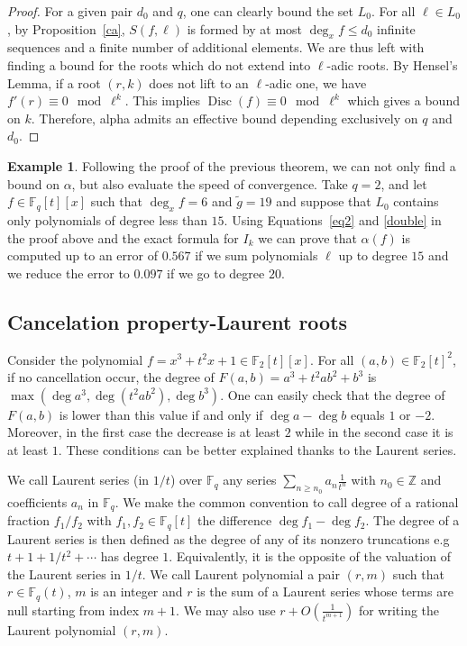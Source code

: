 \documentclass[a4wide]{article}
\newcommand{\F}{{\mathbb F}}
\newcommand{\Z}{{\mathbb Z}}
\DeclareMathOperator{\Disc}{Disc}
\theoremstyle{plain}
\theoremstyle{definition}
\newtheorem{ex}[theo]{Example}
\theoremstyle{remark}
\begin{document}
\begin{proof}
For a given pair $d_0$ and $q$, one can clearly bound the set $L_0$.
For all $\ell\in L_0$, by Proposition~\ref{ca}, $S(f,\ell)$ is formed by at most
$\deg_xf\leq d_0$ infinite sequences and a finite number of additional
elements. We are thus left with finding a bound for the roots which do not
extend into $\ell$-adic roots. By Hensel's
Lemma, if a root $(r,k)$ does not lift to an $\ell$-adic one, we have
$f'(r)\equiv 0\mod \ell^k$. This implies $\Disc(f)\equiv 0\mod \ell^k$ which
gives a bound on $k$. Therefore, alpha admits an effective bound depending exclusively on $q$ and $d_0$. 
\end{proof}
\begin{ex}
     Following the proof of the previous theorem, we can not only find a
     bound on $\alpha$, but also evaluate the speed of convergence.
	Take $q=2$, and let $f\in \F_q[t][x]$ such that $\deg_x f=6$
	and $\tilde{g}=19$ and suppose that $L_0$ contains only polynomials of degree
	less than $15$. Using Equations~\ref{eq2} and \ref{double} in the
	proof above and the exact formula for $I_k$ we can prove that
	$\alpha(f)$ is computed up to an error of $0.567$ if we sum
	polynomials $\ell$ up to degree $15$ and we reduce the error to
	$0.097$ if we go to degree $20$. 
\end{ex}

\subsection{Cancelation property-Laurent roots}
Consider the polynomial $f=x^3+t^2x+1\in\F_2[t][x]$. For all $(a,b)\in
\F_2[t]^2$, if no cancellation occur, the degree of $F(a,b)=a^3+t^2ab^2+b^3$ is $\max(\deg
a^3,\deg(t^2ab^2),\deg b^3)$. One can easily check that the degree of
$F(a,b)$ is lower than this value if and only if $\deg a-\deg b$
equals $1$ or $-2$. Moreover, in the first case the decrease is at least $2$
while in the second case it is at least $1$. These conditions can be better
explained thanks to the Laurent series.

We call Laurent series (in $1/t$) over $\F_q$ any series 
$\sum_{n\geq n_0} a_n \frac{1}{t^n}$ with $n_0\in\Z$ and coefficients $a_n$
in $\F_q$. We make the common convention to call degree of a rational fraction $f_1/f_2$ with
$f_1,f_2\in\F_q[t]$ the difference $\deg f_1-\deg f_2$. The degree of a 
Laurent series is then defined as the degree of any of its nonzero truncations e.g
$t+1+1/t^2+\cdots$ has degree $1$. Equivalently, it is the opposite of the
valuation of the Laurent series in $1/t$. We call Laurent polynomial a pair $(r,m)$
such that $r\in \F_q(t)$, $m$ is an integer and $r$ is the sum of a Laurent series whose terms
are null starting from index $m+1$. We may also use
$r+O(\frac{1}{t^{m+1}})$ for
writing the Laurent polynomial $(r,m)$. 
\end{document}
